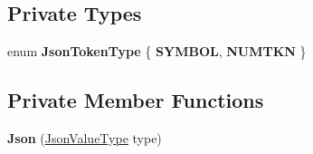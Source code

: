 \subsection*{Private Types}
\begin{DoxyCompactItemize}
\item 
\mbox{\label{classnta_1_1utils_1_1Json_aa2dc580b7a31ea9cef4226527b4599f3}} 
enum {\bfseries Json\+Token\+Type} \{ {\bfseries S\+Y\+M\+B\+OL}, 
{\bfseries N\+U\+M\+T\+KN}
 \}
\end{DoxyCompactItemize}
\subsection*{Private Member Functions}
\begin{DoxyCompactItemize}
\item 
\mbox{\label{classnta_1_1utils_1_1Json_ac86f6995528403eb265d2cd8a46ed4eb}} 
{\bfseries Json} (\hyperlink{namespacenta_1_1utils_ac9921c0a3baf86d9facdc4927c66def3}{Json\+Value\+Type} type)
\end{DoxyCompactItemize}
